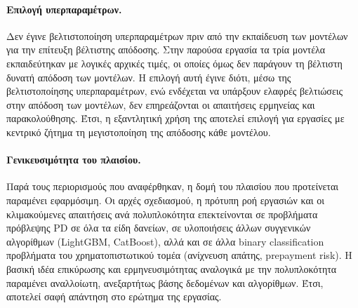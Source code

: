 \paragraph{Επιλογή υπερπαραμέτρων.}
Δεν έγινε βελτιστοποίηση υπερπαραμέτρων πριν από την εκπαίδευση
των μοντέλων για την επίτευξη βέλτιστης απόδοσης. Στην παρούσα
εργασία τα τρία μοντέλα εκπαιδεύτηκαν με λογικές αρχικές τιμές,
οι οποίες όμως δεν παράγουν τη βέλτιστη δυνατή απόδοση των
μοντέλων. Η επιλογή αυτή έγινε διότι, μέσω της βελτιστοποίησης
υπερπαραμέτρων, ενώ ενδέχεται να υπάρξουν ελαφρές βελτιώσεις
στην απόδοση των μοντέλων, δεν επηρεάζονται οι απαιτήσεις
ερμηνείας και παρακολούθησης. Έτσι, η εξαντλητική χρήση της
αποτελεί επιλογή για εργασίες με κεντρικό ζήτημα τη
μεγιστοποίηση της απόδοσης κάθε μοντέλου.

\paragraph{Γενικευσιμότητα του πλαισίου.}
Παρά τους περιορισμούς που αναφέρθηκαν, η δομή του πλαισίου που
προτείνεται παραμένει εφαρμόσιμη. Οι αρχές σχεδιασμού, η πρότυπη
ροή εργασιών και οι κλιμακούμενες απαιτήσεις ανά πολυπλοκότητα
επεκτείνονται σε προβλήματα πρόβλεψης PD σε όλα τα είδη δανείων,
σε υλοποιήσεις άλλων συγγενικών αλγορίθμων (LightGBM, CatBoost),
αλλά και σε άλλα binary classification προβλήματα του
χρηματοπιστωτικού τομέα (ανίχνευση απάτης, prepayment risk). Η
βασική ιδέα επικύρωσης και ερμηνευσιμότητας αναλογικά με την
πολυπλοκότητα παραμένει αναλλοίωτη, ανεξαρτήτως βάσης δεδομένων
και αλγορίθμων. Έτσι, αποτελεί σαφή απάντηση στο ερώτημα της
εργασίας.